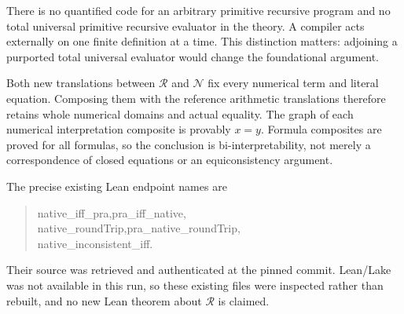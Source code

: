 There is no quantified code for an arbitrary primitive recursive
program and no total universal primitive recursive evaluator in the
theory. A compiler acts externally on one finite definition at a time.
This distinction matters: adjoining a purported total universal
evaluator would change the foundational argument.

Both new translations between $\mathcal R$ and $\mathcal N$ fix every
numerical term and literal equation. Composing them with the reference
arithmetic translations therefore retains whole numerical domains and
actual equality. The graph of each numerical interpretation composite
is provably $x=y$. Formula composites are proved for all formulas, so
the conclusion is bi-interpretability, not merely a correspondence of
closed equations or an equiconsistency argument.

The precise existing Lean endpoint names are
\begin{quote}\small\ttfamily
native\_iff\_pra,\quad pra\_iff\_native,\\
native\_roundTrip,\quad pra\_native\_roundTrip,\\
native\_inconsistent\_iff.
\end{quote}
Their source was retrieved and
authenticated at the pinned commit. Lean/Lake was not available in this
run, so these existing files were inspected rather than rebuilt, and no
new Lean theorem about $\mathcal R$ is claimed.
